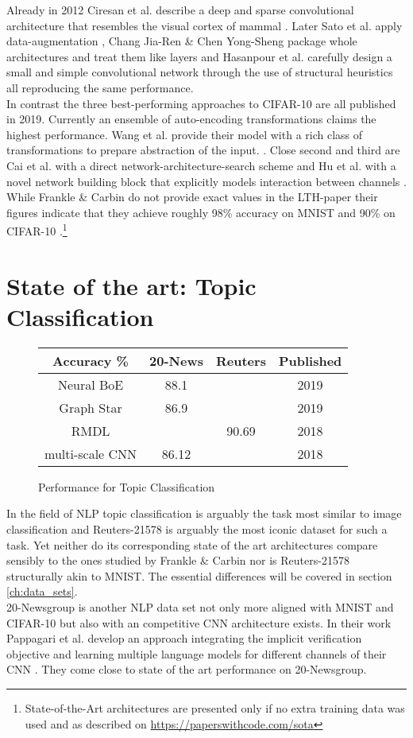 Already in 2012 Ciresan et al. describe a deep and sparse convolutional architecture that resembles the visual cortex of mammal \cite{Multi-Column}. Later Sato et al. apply data-augmentation \cite{APAC}, Chang Jia-Ren \& Chen Yong-Sheng package whole architectures and treat them like layers \cite{Batch-Normalized} and Hasanpour et al. carefully design a small and simple convolutional network through the use of structural heuristics \cite{Keep-It-Simple} all reproducing the same performance.\\
In contrast the three best-performing approaches to CIFAR-10 are all published in 2019. Currently an ensemble of auto-encoding transformations claims the highest performance. Wang et al. provide their model with a rich class of transformations to prepare abstraction of the input. \cite{EnAET}. Close second and third are Cai et al. with a direct network-architecture-search scheme \cite{Direct-NAS} and Hu et al. with a novel network building block that explicitly models interaction between channels \cite{Squee}. \\ 
While Frankle \& Carbin do not provide exact values in the LTH-paper their figures indicate that they achieve roughly 98\% accuracy on MNIST and 90\% on CIFAR-10 \cite{LTH}.\footnote
{State-of-the-Art architectures are presented only if no extra training data was used and as described on \href{https://paperswithcode.com/sota}{https://paperswithcode.com/sota}}


\section{State of the art: Topic Classification}
\begin{figure}
	\begin{tabular}{c|c|c|c}
		Accuracy \% & 20-News & Reuters & Published\\
		\hline
		Neural BoE & 88.1 &  & 2019 \\
		Graph Star & 86.9 &  & 2019 \\
		RMDL &  & 90.69 & 2018 \\
		\hline
		multi-scale CNN & 86.12 &  & 2018 \\
		
	\end{tabular}
	\caption{Performance for Topic Classification}
\end{figure}
In the field of NLP topic classification is arguably the task most similar to image classification and Reuters-21578 is arguably the most iconic dataset for such a task. Yet neither do its corresponding state of the art architectures compare sensibly to the ones studied by Frankle \& Carbin nor is Reuters-21578 structurally akin to MNIST. The essential differences will be covered in section \ref{ch:data_sets}. \\
20-Newsgroup is another NLP data set not only more aligned with MNIST and CIFAR-10 but also with an competitive CNN architecture exists. In their work Pappagari et al. develop an approach integrating the implicit verification objective and learning multiple language models for different channels of their CNN \cite{End-to-End-CNN}. They come close to state of the art performance on 20-Newsgroup. 

